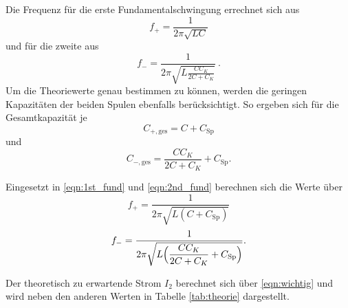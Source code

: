Die Frequenz für die erste Fundamentalschwingung errechnet sich aus 
\begin{equation}
    \label{eqn:1st_fund}
    f_+ = \frac{1}{2\pi\sqrt{LC}}
\end{equation}
und für die zweite aus
\begin{equation}
    \label{eqn:2nd_fund}
    f_- = \frac{1}{2\pi\sqrt{L\frac{CC_K}{2C+C_K}}}\:.
\end{equation}
Um die Theoriewerte genau bestimmen zu können, werden die geringen Kapazitäten der beiden Spulen ebenfalls berücksichtigt.
So ergeben sich für die Gesamtkapazität je 
\begin{equation} %
    C_{+, \text{ges}} = C + C_\text{Sp}
\end{equation}
und
\begin{equation}
    C_{-, \text{ges}} = \frac{CC_K}{2C+C_K} + C_\text{Sp}.
\end{equation}

Eingesetzt in \eqref{eqn:1st_fund} und \eqref{eqn:2nd_fund} berechnen sich die Werte über
\begin{equation}
    \label{eqn:1st_fund_Csp}
    f_+ = \frac{1}{2\pi\sqrt{L(C + C_\text{Sp})}}
\end{equation}
\begin{equation}
    \label{eqn:2nd_fund_Csp}
    f_- = \frac{1}{2\pi\sqrt{L\Bigl(\dfrac{CC_K}{2C+C_K} + C_\text{Sp}\Bigr)}}.
\end{equation}

Der theoretisch zu erwartende Strom $I_2$ berechnet sich über \eqref{eqn:wichtig} und wird neben den anderen Werten in Tabelle \ref{tab:theorie} dargestellt.

